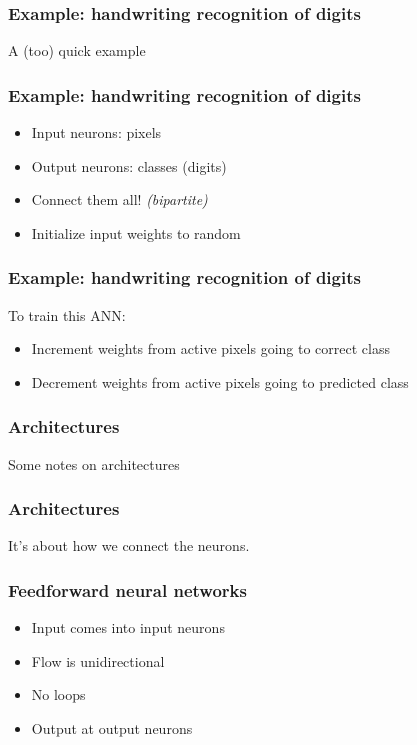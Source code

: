 \begin{frame}
  \frametitle{Example: handwriting recognition of digits}
  \vspace{2cm}
  \centerline{\huge A (too) quick example}
\end{frame}

\begin{frame}
  \frametitle{Example: handwriting recognition of digits}
  \begin{itemize}
  \item<1-> Input neurons: pixels
  \item<1-> Output neurons: classes (digits)
  \item<1-> Connect them all! \textit{(bipartite)}
  \item<2-> Initialize input weights to random
  \end{itemize}
\end{frame}

\begin{frame}
  \frametitle{Example: handwriting recognition of digits}
  To train this ANN:
  \begin{itemize}
  \item<1-> Increment weights from active pixels going to correct class
  \item<1-> Decrement weights from active pixels going to predicted class
  \end{itemize}
\end{frame}

\begin{frame}
  \frametitle{Architectures}
  \vspace{2cm}
  \centerline{\huge Some notes on architectures}
\end{frame}

\begin{frame}
  \frametitle{Architectures}
  It's about how we connect the neurons.
\end{frame}

\begin{frame}
  \frametitle{Feedforward neural networks}
  \begin{itemize}
  \item Input comes into input neurons
  \item Flow is unidirectional
  \item No loops
  \item Output at output neurons
  \end{itemize}
\end{frame}

